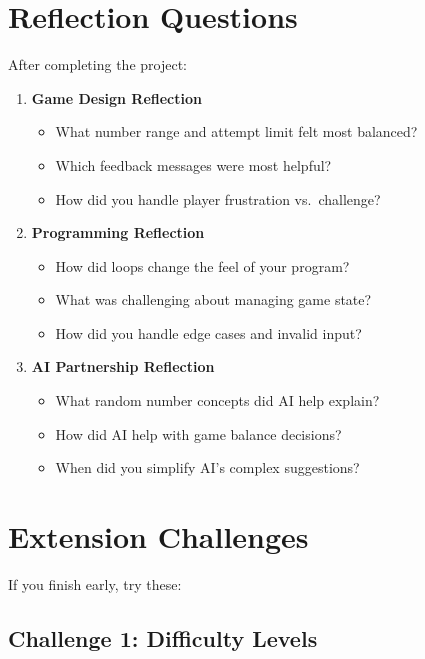 \documentclass[
  letterpaper,
  DIV=11,
  numbers=noendperiod,
  oneside]{scrreprt}
\providecommand{\tightlist}{%
  \setlength{\itemsep}{0pt}\setlength{\parskip}{0pt}}\usepackage{longtable,booktabs,array}
\begin{document}
\section{Reflection Questions}\label{reflection-questions-2}

After completing the project:

\begin{enumerate}
\def\labelenumi{\arabic{enumi}.}
\tightlist
\item
  \textbf{Game Design Reflection}

  \begin{itemize}
  \tightlist
  \item
    What number range and attempt limit felt most balanced?
  \item
    Which feedback messages were most helpful?
  \item
    How did you handle player frustration vs.~challenge?
  \end{itemize}
\item
  \textbf{Programming Reflection}

  \begin{itemize}
  \tightlist
  \item
    How did loops change the feel of your program?
  \item
    What was challenging about managing game state?
  \item
    How did you handle edge cases and invalid input?
  \end{itemize}
\item
  \textbf{AI Partnership Reflection}

  \begin{itemize}
  \tightlist
  \item
    What random number concepts did AI help explain?
  \item
    How did AI help with game balance decisions?
  \item
    When did you simplify AI's complex suggestions?
  \end{itemize}
\end{enumerate}

\section{Extension Challenges}\label{extension-challenges-2}

If you finish early, try these:

\subsection{Challenge 1: Difficulty
Levels}\label{challenge-1-difficulty-levels}
\end{document}
